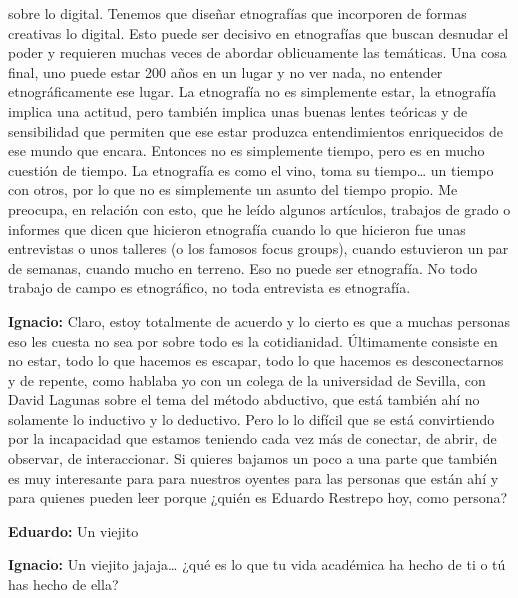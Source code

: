 \documentclass[
]{interact}
\begin{document}
sobre lo digital. Tenemos que diseñar etnografías que incorporen de
formas creativas lo digital. Esto puede ser decisivo en etnografías que
buscan desnudar el poder y requieren muchas veces de abordar
oblicuamente las temáticas. Una cosa final, uno puede estar 200 años en
un lugar y no ver nada, no entender etnográficamente ese lugar. La
etnografía no es simplemente estar, la etnografía implica una actitud,
pero también implica unas buenas lentes teóricas y de sensibilidad que
permiten que ese estar produzca entendimientos enriquecidos de ese mundo
que encara. Entonces no es simplemente tiempo, pero es en mucho cuestión
de tiempo. La etnografía es como el vino, toma su tiempo\ldots{} un
tiempo con otros, por lo que no es simplemente un asunto del tiempo
propio. Me preocupa, en relación con esto, que he leído algunos
artículos, trabajos de grado o informes que dicen que hicieron
etnografía cuando lo que hicieron fue unas entrevistas o unos talleres
(o los famosos focus groups), cuando estuvieron un par de semanas,
cuando mucho en terreno. Eso no puede ser etnografía. No todo trabajo de
campo es etnográfico, no toda entrevista es etnografía.

\textbf{Ignacio:} Claro, estoy totalmente de acuerdo y lo cierto es que
a muchas personas eso les cuesta no sea por sobre todo es la
cotidianidad. Últimamente consiste en no estar, todo lo que hacemos es
escapar, todo lo que hacemos es desconectarnos y de repente, como
hablaba yo con un colega de la universidad de Sevilla, con David Lagunas
sobre el tema del método abductivo, que está también ahí no solamente lo
inductivo y lo deductivo. Pero lo lo difícil que se está convirtiendo
por la incapacidad que estamos teniendo cada vez más de conectar, de
abrir, de observar, de interaccionar. Si quieres bajamos un poco a una
parte que también es muy interesante para para nuestros oyentes para las
personas que están ahí y para quienes pueden leer porque ¿quién es
Eduardo Restrepo hoy, como persona?

\textbf{Eduardo:} Un viejito

\textbf{Ignacio:} Un viejito jajaja\ldots{} ¿qué es lo que tu vida
académica ha hecho de ti o tú has hecho de ella?
\end{document}
